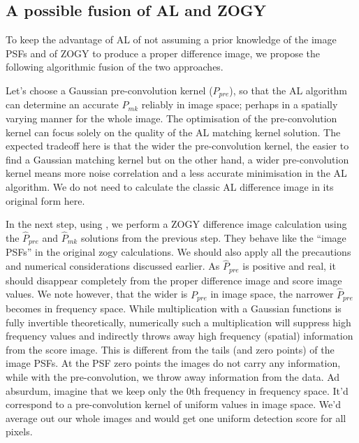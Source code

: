 \subsection{A possible fusion of AL and ZOGY}
To keep the advantage of AL of not assuming a prior knowledge of the
image PSFs and of ZOGY to produce a proper difference image, we
propose the following algorithmic fusion of the two approaches.
%
\par Let's choose a Gaussian pre-convolution kernel (\(P_{pre}\)), so
that the AL algorithm can determine an accurate \(P_{mk}\) reliably in
image space; perhaps in a spatially varying manner for the whole
image. The optimisation of the pre-convolution kernel can focus solely
on the quality of the AL matching kernel solution. The expected
tradeoff here is that the wider the pre-convolution kernel, the easier
to find a Gaussian matching kernel but on the other hand, a wider
pre-convolution kernel means more noise correlation and a less accurate
minimisation in the AL algorithm. We do not need to calculate the
classic AL difference image in its original  form here.
%
\par In the next step, using , we perform a ZOGY
difference image calculation using the \(\hat{P}_{pre}\) and
\(\hat{P}_{mk}\) solutions from the previous step. They behave like
the ``image PSFs'' in the original zogy calculations. We should also
apply all the precautions and numerical considerations discussed
earlier. As \(\hat{P}_{pre}\) is positive and real, it should
disappear completely from the proper difference image and score image
values. We note however, that the wider is \({P}_{pre}\) in image
space, the narrower \(\hat{P}_{pre}\) becomes in frequency
space. While multiplication with a Gaussian functions is fully
invertible theoretically, numerically such a multiplication will
suppress high frequency values and indirectly throws away high
frequency (spatial) information from the score image. This is
different from the tails (and zero points) of the image PSFs. At the
PSF zero points the images do not carry any information, while with
the pre-convolution, we throw away information from the data. Ad
absurdum, imagine that we keep only the 0th frequency in frequency
space. It'd correspond to a pre-convolution kernel of uniform values
in image space. We'd average out our whole images and would get one
uniform detection score for all pixels.
%
